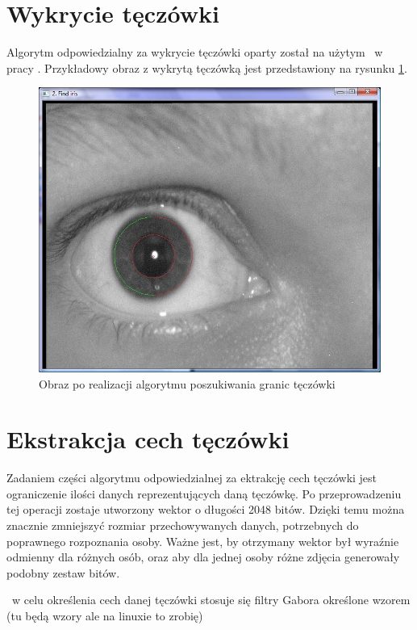 \section{Wykrycie tęczówki}
\label{sec:wykrycieTeczowki}
Algorytm odpowiedzialny za wykrycie tęczówki oparty został na użytym ~w pracy \cite{Gl11}. Przykładowy obraz z wykrytą tęczówką jest przedstawiony na rysunku \ref{fig:teczowkaNasza}.
\begin{figure}
\begin{center}
\includegraphics[scale=0.5]{teczowka.jpg}
\caption{Obraz po realizacji algorytmu poszukiwania granic tęczówki}
\label{fig:teczowkaNasza}
\end{center}
\end{figure}

\section{Ekstrakcja cech tęczówki}
\label{sec:ekstrakcja}
Zadaniem części algorytmu odpowiedzialnej za ektrakcję cech tęczówki jest ograniczenie ilości danych reprezentujących daną tęczówkę. Po przeprowadzeniu tej operacji zostaje utworzony wektor o długości 2048 bitów. Dzięki temu można znacznie zmniejszyć rozmiar przechowywanych danych, potrzebnych do poprawnego rozpoznania osoby. Ważne jest, by otrzymany wektor był wyraźnie odmienny dla różnych osób, oraz aby dla jednej osoby różne zdjęcia generowały podobny zestaw bitów. 

~w celu określenia cech danej tęczówki stosuje się filtry Gabora określone wzorem (tu będą wzory ale na linuxie to zrobię)

